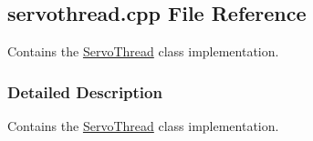 \hypertarget{a00023}{}\subsection{servothread.\+cpp File Reference}
\label{a00023}


Contains the \hyperlink{a00009}{Servo\+Thread} class implementation.  




\subsubsection{Detailed Description}
Contains the \hyperlink{a00009}{Servo\+Thread} class implementation. 

